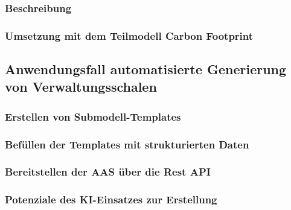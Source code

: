 \subsubsection{Beschreibung}
\subsubsection{Umsetzung mit dem Teilmodell Carbon Footprint}
\subsection{Anwendungsfall automatisierte Generierung von Verwaltungsschalen}
\subsubsection{Erstellen von Submodell-Templates}
\subsubsection{Befüllen der Templates mit strukturierten Daten}
\subsubsection{Bereitstellen der AAS über die Rest API}
\subsubsection{Potenziale des KI-Einsatzes zur Erstellung}